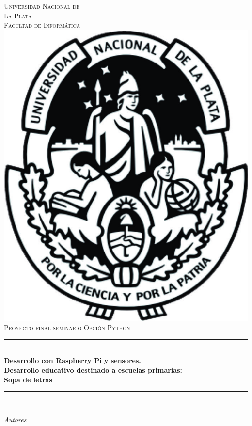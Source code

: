 \newcommand{\HRule}{\rule{\linewidth}{0.5mm}} 

\begin{titlepage}
\center
\textsc{
\Huge{Universidad Nacional de \\La Plata}\\[.5cm]
\Large
Facultad de Informática\\[1cm] 
\includegraphics[scale=0.4]{img/UNLP.jpg}\\[3cm]
Proyecto final seminario Opción Python}\\[.5cm] 

\sffamily
\HRule \\[0.4cm]
\textbf{\Large Desarrollo con Raspberry Pi y sensores.\\ Desarrollo educativo destinado a escuelas primarias:\\ Sopa de letras}\\[0.2cm] 
\HRule \\[3cm]
 
\large
\begin{minipage}[t]{.4\textwidth}
\begin{flushleft}
\emph{Autores}


\end{flushleft}
\end{minipage}
\end{titlepage}
